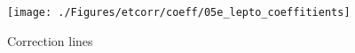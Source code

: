 \begin{figure}[p]
\centering
\texttt{[image: ./Figures/etcorr/coeff/05e\_lepto\_coeffitients]}
\caption{Correction lines}
\label{fig:05e_lepto_coeffitients}
\end{figure}
